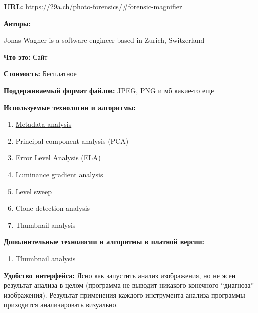 \textbf{URL: } \url{ https://29a.ch/photo-forensics/#forensic-magnifier}

\textbf{Авторы:}

Jonas Wagner is a software engineer based in Zurich, Switzerland

\textbf{Что это:} Сайт

\textbf{Стоимость:} Бесплатное

\textbf{Поддерживаемый формат файлов:} JPEG, PNG и мб какие-то еще

\textbf{Используемые технологии и алгоритмы:}

\begin{enumerate}
  \item \href{http://fotoforensics.com/tutorial-meta.php}{Metadata analysis}
  \item Principal component analysis (PCA)
    
  \item Error Level Analysis (ELA)
  
  \item Luminance gradient analysis
  
  \item Level sweep
  
  \item Clone detection analysis
  
  \item Thumbnail analysis
\end{enumerate} 

\textbf{Дополнительные технологии и алгоритмы в платной версии:}
\begin{enumerate}
  \item Thumbnail analysis
\end{enumerate} 

\textbf{Удобство интерфейса:}
Ясно как запустить анализ изображения, но не ясен результат анализа в целом (программа не выводит никакого конечного “диагноза” изображения).
Результат применения каждого инструмента анализа программы приходится анализировать визуально.

